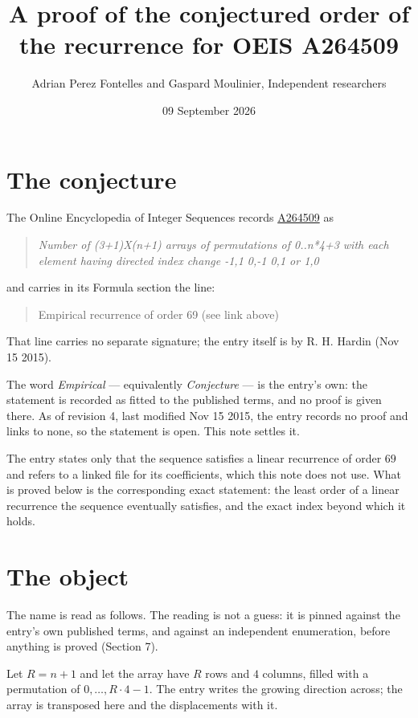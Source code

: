 \documentclass[11pt]{article}
\title{A proof of the conjectured order of the recurrence for OEIS A264509}
\author{Adrian Perez Fontelles and Gaspard Moulinier, Independent researchers}
\date{09 September 2026}
\theoremstyle{definition}
\begin{document}
\maketitle
\section{The conjecture}

The Online Encyclopedia of Integer Sequences records \href{https://oeis.org/A264509}{A264509} as

\begin{quote}\itshape Number of (3+1)X(n+1) arrays of permutations of 0..n*4+3 with each element having directed index change -1,1 0,-1 0,1 or 1,0\end{quote}

and carries in its Formula section the line:

\begin{quote}\ttfamily Empirical recurrence of order 69 (see link above)\end{quote}

That line carries no separate signature; the entry itself is by R. H. Hardin (Nov 15 2015).

The word {\itshape Empirical} --- equivalently {\itshape Conjecture} --- is the entry's own: the statement is recorded as fitted to the published terms, and no proof is given there. As of revision 4, last modified Nov 15 2015, the entry records no proof and links to none, so the statement is open. This note settles it.

The entry states only that the sequence satisfies a linear recurrence of order $69$ and refers to a linked file for its coefficients, which this note does not use. What is proved below is the corresponding exact statement: the least order of a linear recurrence the sequence eventually satisfies, and the exact index beyond which it holds.

\section{The object}

The name is read as follows. The reading is not a guess: it is pinned against the entry's own published terms, and against an independent enumeration, before anything is proved (Section 7).

Let $R = n + 1$ and let the array have $R$ rows and $4$ columns, filled with a permutation of $0,\dots,R\cdot4-1$. The entry writes the growing direction across; the array is transposed here and the displacements with it.
\end{document}
